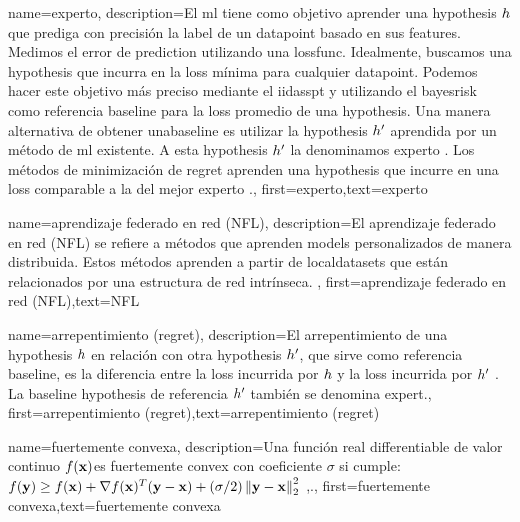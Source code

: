 {{
{name={experto},
	description={El \gls{ml} tiene como objetivo aprender una \gls{hypothesis} $h$ que prediga con precisión la \gls{label} 
		de un \gls{datapoint} basado en sus \gls{feature}s. Medimos el error de \gls{prediction} utilizando una
		\gls{lossfunc}. Idealmente, buscamos una \gls{hypothesis} que incurra en la \gls{loss} mínima
		para cualquier \gls{datapoint}. Podemos hacer este objetivo más preciso mediante el \gls{iidasspt} 
		y utilizando el \gls{bayesrisk} como referencia \gls{baseline} para la \gls{loss} promedio de una \gls{hypothesis}. 
		Una manera alternativa de obtener una\gls{baseline} es utilizar la \gls{hypothesis} $h'$ aprendida 
		por un método de \gls{ml} existente. A esta \gls{hypothesis} $h'$ la denominamos experto \cite{PredictionLearningGames}. Los métodos de minimización de \Gls{regret} aprenden una \gls{hypothesis}
		que incurre en una \gls{loss} comparable a la del mejor experto \cite{PredictionLearningGames,HazanOCO}.},
	first={experto},text={experto} 
}

{name={aprendizaje federado en red (NFL)},
	description={El aprendizaje federado en red (NFL) se refiere 
		a métodos que aprenden \gls{model}s personalizados de manera distribuida. Estos métodos aprenden a partir de \gls{localdataset}s 
		que están relacionados por una estructura de red intrínseca.
		},
 first={aprendizaje federado en red (NFL)},text={NFL} 
}




{name={arrepentimiento (regret)},
	description={El arrepentimiento de una \gls{hypothesis} $h$ en relación con otra 
		\gls{hypothesis} $h'$, que sirve como referencia \gls{baseline}, 
		es la diferencia entre la \gls{loss} incurrida por $h$ y la \gls{loss} 
		incurrida por $h'$ \cite{PredictionLearningGames}. 
		La \gls{baseline} \gls{hypothesis} de referencia $h'$ también se denomina \gls{expert}.},
	first={arrepentimiento (regret)},text={arrepentimiento (regret)} 
}

{name={fuertemente convexa},
	description={Una función real \gls{differentiable} de valor continuo 
		 $f({\bf x})$es fuertemente \gls{convex} con coeficiente $\sigma$ si cumple: $f({\bf y}) \geq f({\bf x}) + \nabla f({\bf x})^{T} ({\bf y} - {\bf x}) + (\sigma/2) \left\Vert {{\bf y}- {\bf x}} \right\Vert_{2}^{2}$ \cite{nesterov04},\cite[Sec. B.1.1]{CvxAlgBertsekas}.},
	first={fuertemente convexa},text={fuertemente convexa} 
}

}}
